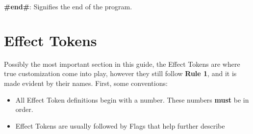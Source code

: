 \documentclass[12pt,letterpaper]{article}
\begin{document}
\textbf{\#end\#}: Signifies the end of the program.

\section{Effect Tokens}

Possibly the most important section in this guide, the Effect Tokens are where true customization come into play, however they still follow \textbf{Rule 1}, and it is made evident by their names. First, some conventions:

\begin{itemize}
	\item All Effect Token definitions begin with a number. These numbers \textbf{must} be in order.
	\item Effect Tokens are usually followed by Flags that help further describe 
\end{itemize}









\end{document}
